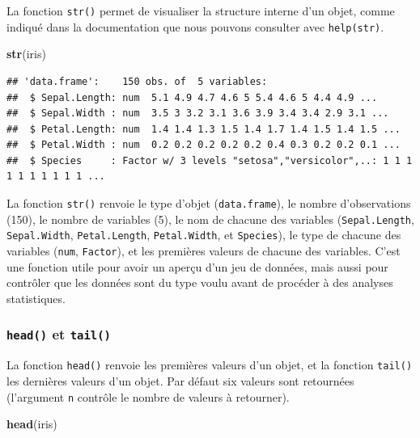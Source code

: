 \documentclass[
]{book}
\newenvironment{Shaded}{\begin{snugshade}}{\end{snugshade}}
\newcommand{\KeywordTok}[1]{\textcolor[rgb]{0.13,0.29,0.53}{\textbf{#1}}}
\newcommand{\NormalTok}[1]{#1}
\begin{document}
La fonction \texttt{str()} permet de visualiser la structure interne d'un objet, comme indiqué dans la documentation que nous pouvons consulter avec \texttt{help(str)}.

\begin{Shaded}
\begin{Highlighting}[]
\KeywordTok{str}\NormalTok{(iris)}
\end{Highlighting}
\end{Shaded}

\begin{verbatim}
## 'data.frame':    150 obs. of  5 variables:
##  $ Sepal.Length: num  5.1 4.9 4.7 4.6 5 5.4 4.6 5 4.4 4.9 ...
##  $ Sepal.Width : num  3.5 3 3.2 3.1 3.6 3.9 3.4 3.4 2.9 3.1 ...
##  $ Petal.Length: num  1.4 1.4 1.3 1.5 1.4 1.7 1.4 1.5 1.4 1.5 ...
##  $ Petal.Width : num  0.2 0.2 0.2 0.2 0.2 0.4 0.3 0.2 0.2 0.1 ...
##  $ Species     : Factor w/ 3 levels "setosa","versicolor",..: 1 1 1 1 1 1 1 1 1 1 ...
\end{verbatim}

La fonction \texttt{str()} renvoie le type d'objet (\texttt{data.frame}), le nombre d'observations (150), le nombre de variables (5), le nom de chacune des variables (\texttt{Sepal.Length}, \texttt{Sepal.Width}, \texttt{Petal.Length}, \texttt{Petal.Width}, et \texttt{Species}), le type de chacune des variables (\texttt{num}, \texttt{Factor}), et les premières valeurs de chacune des variables. C'est une fonction utile pour avoir un aperçu d'un jeu de données, mais aussi pour contrôler que les données sont du type voulu avant de procéder à des analyses statistiques.

\hypertarget{l015head}{%
\subsubsection{\texorpdfstring{\texttt{head()} et \texttt{tail()}}{head() et tail()}}\label{l015head}}

La fonction \texttt{head()} renvoie les premières valeurs d'un objet, et la fonction \texttt{tail()} les dernières valeurs d'un objet. Par défaut six valeurs sont retournées (l'argument \texttt{n} contrôle le nombre de valeurs à retourner).

\begin{Shaded}
\begin{Highlighting}[]
\KeywordTok{head}\NormalTok{(iris)}
\end{Highlighting}
\end{Shaded}
\end{document}
